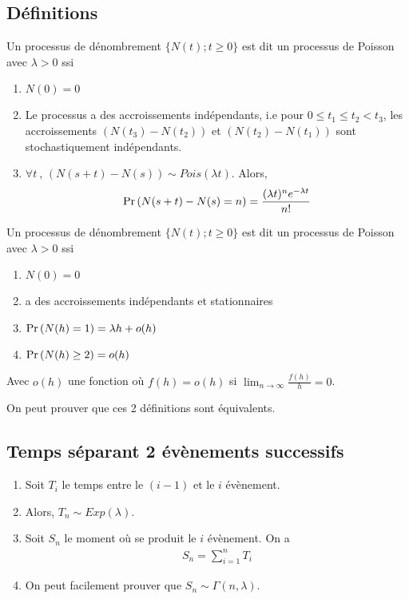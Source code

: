 \documentclass[10pt, french, landscape]{article}
\begin{document}
\begin{multicols*}{3}
\subsection*{Définitions}
\begin{definition}[Définition 1]
Un processus de dénombrement $\{N(t) ; t \geq 0 \}$ est dit un processus de Poisson avec $\lambda >0$ ssi
\begin{enumerate}[label=(\arabic*)]
\item $N(0)=0$
\item Le processus a des accroissements indépendants, i.e pour $0 \leq t_1 \leq t_2 < t_3$, les accroissements $(N(t_3) - N(t_2))$ et $(N(t_2)-N(t_1))$ sont stochastiquement indépendants.
\item $\forall t \ $, $(N(s+t) - N(s)) \sim Pois(\lambda t)$. Alors,
\begin{align*}
\Pr \left( N(s+t) - N(s) = n \right) = \frac{(\lambda t)^n e^{-\lambda t}}{n!}
\end{align*}
\end{enumerate}
\end{definition}

\begin{definition}[Définition 2]
Un processus de dénombrement $\{N(t) ; t \geq 0 \}$ est dit un processus de Poisson avec $\lambda>0$ ssi
\begin{enumerate}[label=(\arabic*)]
\item $N(0)=0$
\item a des accroissements indépendants et stationnaires
\item $\Pr \left( N(h) = 1 \right) = \lambda h + o(h)$
\item $\Pr \left( N(h) \geq 2 \right) = o(h)$
\end{enumerate}
Avec $o(h)$ une fonction où $f(h) = o(h)$ si $\lim_{n \to \infty} \frac{f(h)}{h} = 0$.
\end{definition}
On peut prouver que ces 2 définitions sont équivalents.

\subsection*{Temps séparant 2 évènements successifs}\begin{enumerate}[label=\faAngleRight]
\item Soit $T_i$ le temps entre le $(i-1)$ et le $i$ évènement.

\item Alors, $T_n \sim Exp (\lambda)$.

\item Soit $S_n$ le moment où se produit le $i$ évènement. On a
\begin{align*}
S_n = \sum_{i=1}^{n} T_i
\end{align*}
\item On peut facilement prouver que $S_n \sim \Gamma(n, \lambda)$.


\end{enumerate}
\end{multicols*}
\end{document}

